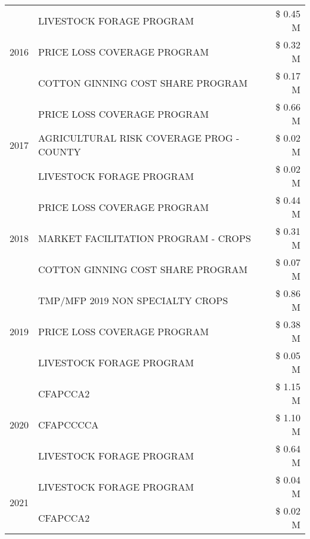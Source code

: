 \begin{tabular}{llr}
\cline{1-3}
\multirow[t]{3}{*}{2016} & LIVESTOCK FORAGE PROGRAM & \$ 0.45 M \\
 & PRICE LOSS COVERAGE PROGRAM & \$ 0.32 M \\
 & COTTON GINNING COST SHARE PROGRAM & \$ 0.17 M \\
\cline{1-3}
\multirow[t]{3}{*}{2017} & PRICE LOSS COVERAGE PROGRAM & \$ 0.66 M \\
 & AGRICULTURAL RISK COVERAGE PROG - COUNTY & \$ 0.02 M \\
 & LIVESTOCK FORAGE PROGRAM & \$ 0.02 M \\
\cline{1-3}
\multirow[t]{3}{*}{2018} & PRICE LOSS COVERAGE PROGRAM & \$ 0.44 M \\
 & MARKET FACILITATION PROGRAM - CROPS & \$ 0.31 M \\
 & COTTON GINNING COST SHARE PROGRAM & \$ 0.07 M \\
\cline{1-3}
\multirow[t]{3}{*}{2019} & TMP/MFP 2019 NON SPECIALTY CROPS & \$ 0.86 M \\
 & PRICE LOSS COVERAGE PROGRAM & \$ 0.38 M \\
 & LIVESTOCK FORAGE PROGRAM & \$ 0.05 M \\
\cline{1-3}
\multirow[t]{3}{*}{2020} & CFAPCCA2 & \$ 1.15 M \\
 & CFAPCCCCA & \$ 1.10 M \\
 & LIVESTOCK FORAGE PROGRAM & \$ 0.64 M \\
\cline{1-3}
\multirow[t]{2}{*}{2021} & LIVESTOCK FORAGE PROGRAM & \$ 0.04 M \\
 & CFAPCCA2 & \$ 0.02 M \\
\cline{1-3}
\bottomrule
\end{tabular}

